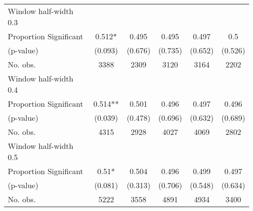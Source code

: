 \begin{tabular}{l*{5}{c}}
\hline
Window half-width 0.3\\

Proportion Significant& 0.512* &  0.495 &  0.495 &  0.497 &  0.5\\

(p-value) & (0.093) &  (0.676) &  (0.735) &  (0.652) &  (0.526)\\

No. obs.& 3388 &  2309 &  3120 &  3164 &  2202\\

\hline
Window half-width 0.4\\

Proportion Significant& 0.514** &  0.501 &  0.496 &  0.497 &  0.496\\

(p-value) & (0.039) &  (0.478) &  (0.696) &  (0.632) &  (0.689)\\

No. obs.& 4315 &  2928 &  4027 &  4069 &  2802\\

\hline
Window half-width 0.5\\

Proportion Significant& 0.51* &  0.504 &  0.496 &  0.499 &  0.497\\

(p-value) & (0.081) &  (0.313) &  (0.706) &  (0.548) &  (0.634)\\

No. obs.& 5222 &  3558 &  4891 &  4934 &  3400\\

\hline\hline
\end{tabular}

